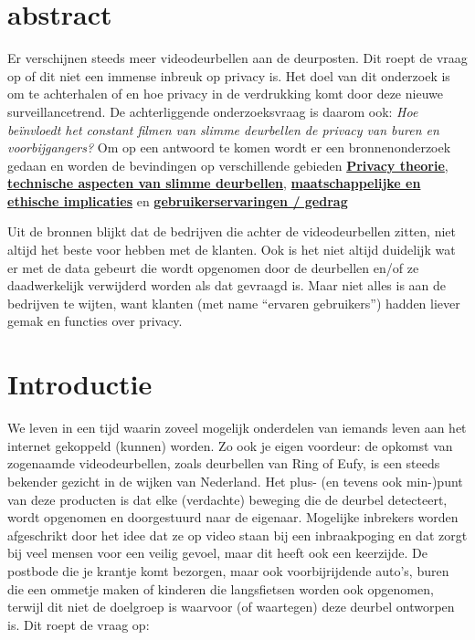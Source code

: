 \documentclass[nonacm, sigconf, balance=true]{acmart}
\begin{document}
    \section{abstract}
    Er verschijnen steeds meer videodeurbellen aan de deurposten.
    Dit roept de vraag op of dit niet een immense inbreuk op privacy is.
    Het doel van dit onderzoek is om te achterhalen of en hoe privacy in de verdrukking komt door deze nieuwe surveillancetrend.
    De achterliggende onderzoeksvraag is daarom ook: \textit{Hoe beïnvloedt het constant filmen van slimme deurbellen de privacy van buren en voorbijgangers?}
    Om op een antwoord te komen wordt er een bronnenonderzoek gedaan en worden de bevindingen op verschillende gebieden \hyperref[subsec:privacy-theorie]{\textbf{Privacy theorie}}, \hyperref[subsec:technische-aspecten-van-slimme-deurbellen]{\textbf{technische aspecten van slimme deurbellen}}, \hyperref[subsec:maatschappelijke-en-ethische-implicaties]{\textbf{maatschappelijke en ethische implicaties}} en \hyperref[subsec:gebruikerservaring-/-gedrag2]{\textbf{gebruikerservaringen / gedrag}}

    Uit de bronnen blijkt dat de bedrijven die achter de videodeurbellen zitten, niet altijd het beste voor hebben met de klanten.
    Ook is het niet altijd duidelijk wat er met de data gebeurt die wordt opgenomen door de deurbellen en/of ze daadwerkelijk verwijderd worden als dat gevraagd is.
    Maar niet alles is aan de bedrijven te wijten, want klanten (met name ``ervaren gebruikers'') hadden liever gemak en functies over privacy.


    \section{Introductie}
    We leven in een tijd waarin zoveel mogelijk onderdelen van iemands leven aan het internet gekoppeld (kunnen) worden.
    Zo ook je eigen voordeur: de opkomst van zogenaamde videodeurbellen, zoals deurbellen van Ring of Eufy, is een steeds bekender gezicht in de wijken van Nederland.
    Het plus- (en tevens ook min-)punt van deze producten is dat elke (verdachte) beweging die de deurbel detecteert, wordt opgenomen en doorgestuurd naar de eigenaar.
    Mogelijke inbrekers worden afgeschrikt door het idee dat ze op video staan bij een inbraakpoging en dat zorgt bij veel mensen voor een veilig gevoel, maar dit heeft ook een keerzijde.
    De postbode die je krantje komt bezorgen, maar ook voorbijrijdende auto's, buren die een ommetje maken of kinderen die langsfietsen worden ook opgenomen, terwijl dit niet de doelgroep is waarvoor (of waartegen) deze deurbel ontworpen is.
    Dit roept de vraag op:
\end{document}
